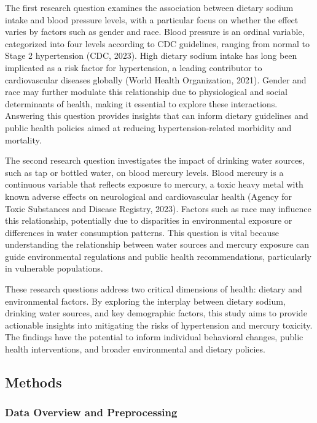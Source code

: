 \documentclass[
  letterpaper,
  DIV=11,
  numbers=noendperiod]{scrartcl}
\begin{document}
The first research question examines the association between dietary
sodium intake and blood pressure levels, with a particular focus on
whether the effect varies by factors such as gender and race. Blood
pressure is an ordinal variable, categorized into four levels according
to CDC guidelines, ranging from normal to Stage 2 hypertension (CDC,
2023). High dietary sodium intake has long been implicated as a risk
factor for hypertension, a leading contributor to cardiovascular
diseases globally (World Health Organization, 2021). Gender and race may
further modulate this relationship due to physiological and social
determinants of health, making it essential to explore these
interactions. Answering this question provides insights that can inform
dietary guidelines and public health policies aimed at reducing
hypertension-related morbidity and mortality.

The second research question investigates the impact of drinking water
sources, such as tap or bottled water, on blood mercury levels. Blood
mercury is a continuous variable that reflects exposure to mercury, a
toxic heavy metal with known adverse effects on neurological and
cardiovascular health (Agency for Toxic Substances and Disease Registry,
2023). Factors such as race may influence this relationship, potentially
due to disparities in environmental exposure or differences in water
consumption patterns. This question is vital because understanding the
relationship between water sources and mercury exposure can guide
environmental regulations and public health recommendations,
particularly in vulnerable populations.

These research questions address two critical dimensions of health:
dietary and environmental factors. By exploring the interplay between
dietary sodium, drinking water sources, and key demographic factors,
this study aims to provide actionable insights into mitigating the risks
of hypertension and mercury toxicity. The findings have the potential to
inform individual behavioral changes, public health interventions, and
broader environmental and dietary policies.

\subsection{Methods}\label{methods}

\subsubsection{Data Overview and
Preprocessing}\label{data-overview-and-preprocessing}
\end{document}
